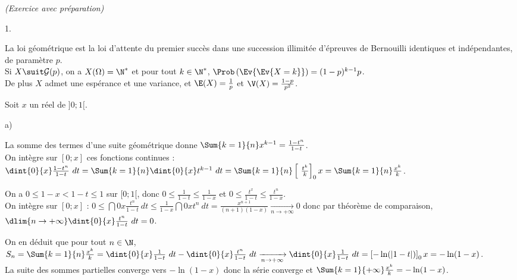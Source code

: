 \documentclass[11pt]{article}%
\begin{document}
 \begin{exercice}{\it (Exercice avec préparation)}~
 \begin{noliste}{1.}
 \setlength{\itemsep}{4mm}
 \item La loi géométrique est la loi d'attente du premier succès dans
une succession illimitée d'épreuves de Bernouilli identiques et
indépendantes, de paramètre $p$. \\
 Si $X \suit \mathcal{G} (p)$, on a $X(\Omega) = \N^*$ et pour tout $k
\in \N^*$, $\Prob\left(\Ev{\Ev{X = k}}\right) = (1-p)^{k-1} p$. \\
 De plus $X$ admet une espérance et une variance, et $\E(X) =
\frac{1}{p}$ et $\V(X) = \frac{1-p}{p^{2}}$. \\
 \item Soit $x$ un réel de $]0 ; 1[$.
 \begin{noliste}{a)}
 \setlength{\itemsep}{2mm} 
 \item La somme des termes d'une suite géométrique donne $\Sum{k =
1}{n} x^{k-1} = \frac{1 - t^{n}}{1-t}$. \\
 On intègre sur $[ 0 ; x]$ ces fonctions continues : \\
 $\dint{0}{x} \frac{1-t^{n}}{1-t}\ dt = \Sum{k = 1}{n} \dint{0}{x}
t^{k-1}\ dt = \Sum{k = 1}{n}\left[ \ \frac{t^{k}}{k} \right]_{0}{x} =
\Sum{k = 1}{n}\frac{x^{k}}{k}$. \\
 \item On a $ 0 \leq 1-x < 1-t \leq 1$ sur $[ 0 ; 1[$, donc $0 \leq
\frac{1}{1-t} \leq \frac{1}{1-x}$ et $0 \leq \frac{t^{x}}{1-t} \leq
\frac{t^{n}}{1-x}$. \\
 On intègre sur $[ 0 ; x]$ : $ 0 \leq \dint{0}{x} \frac{t^{n}}{1-t}\ dt
\leq \frac{1}{1-x} \dint{0}{x} t^{n}\ dt = \frac{x^{n + 1} }{(n + 1)
(1-x)} \xrightarrow[ n \rightarrow + \infty]{} 0$ donc par théorème de
comparaison, $\dlim{n \rightarrow + \infty} \dint{0}{x}
\frac{t^{n}}{1-t}\ dt = 0$. \\
 \item On en déduit que pour tout $n \in \N$, $S_{n} = \Sum{k = 1}{n}
\frac{x^{k}}{k} = \dint{0}{x} \frac{1}{1-t}\ dt - \dint{0}{x}
\frac{t^{n}}{1-t}\ dt \xrightarrow[ n \rightarrow + \infty]{}
\dint{0}{x} \frac{1}{1-t}\ dt = \left[ - \ln (| 1-t | ) \right]_{0}{x}
= - \ln (1-x) $. \\
 La suite des sommes partielles converge vers $- \ln (1-x)$ donc la
série converge et $\Sum{k = 1}{+ \infty} \frac{x^{k}}{k} = - \ln
(1-x)$. \\
 \end{noliste}

\end{noliste}
\end{exercice}
\end{document}

